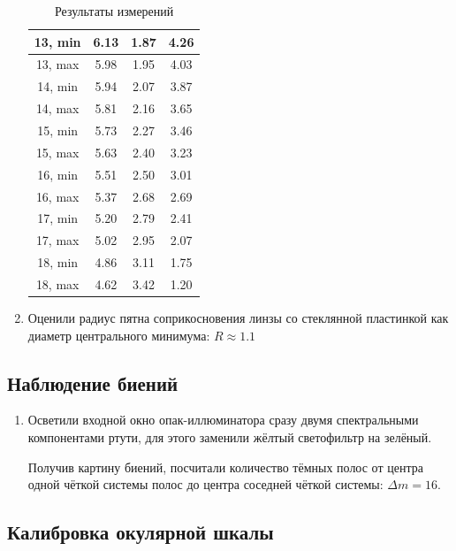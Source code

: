 \documentclass[a4paper,12pt]{article} %
\begin{document}
\begin{enumerate}
\begin{table}[h]
\begin{tabular}{|c|c|c|c|}
        13, min & 6.13 & 1.87 & 4.26 \\ \hline
        13, max & 5.98 & 1.95 & 4.03 \\ \hline
        14, min & 5.94 & 2.07 & 3.87 \\ \hline
        14, max & 5.81 & 2.16 & 3.65 \\ \hline
        15, min & 5.73 & 2.27 & 3.46 \\ \hline
        15, max & 5.63 & 2.40 & 3.23 \\ \hline
        16, min & 5.51 & 2.50 & 3.01 \\ \hline
        16, max & 5.37 & 2.68 & 2.69 \\ \hline
        17, min & 5.20 & 2.79 & 2.41 \\ \hline
        17, max & 5.02 & 2.95 & 2.07 \\ \hline
        18, min & 4.86 & 3.11 & 1.75 \\ \hline
        18, max & 4.62 & 3.42 & 1.20 \\ \hline
    \end{tabular}
    \caption{Результаты измерений}
    \label{tab1}
\end{table}

    \item Оценили радиус пятна соприкосновения линзы со стеклянной пластинкой как диаметр центрального минимума: $R\approx1.1$
\end{enumerate}

\subsection{Наблюдение биений}

\begin{enumerate}
    \item Осветили входной окно опак-иллюминатора сразу двумя спектральными компонентами ртути, для этого заменили жёлтый светофильтр на зелёный.

    Получив картину биений, посчитали количество тёмных полос от центра одной чёткой системы полос до центра соседней чёткой системы: $\Delta m=16$.
    
\end{enumerate}

\subsection{Калибровка окулярной шкалы}
\end{document}
